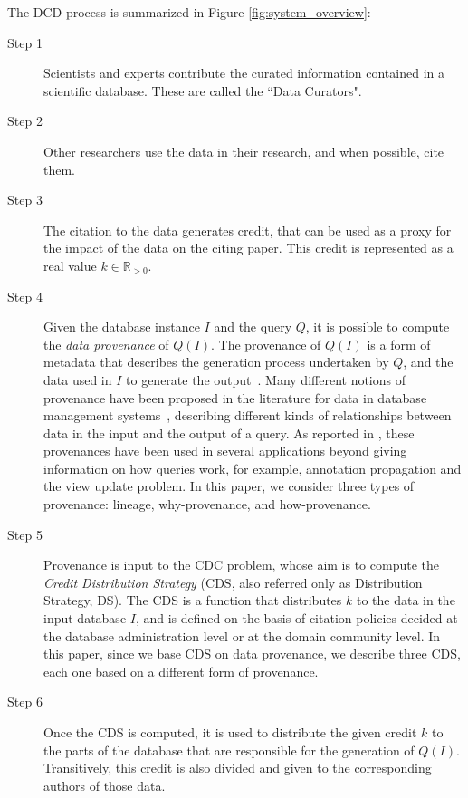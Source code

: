 \vspace{0.15in}
The DCD process is summarized in Figure \ref{fig:system_overview}:
\vspace{0.15in}
\begin{description}
	\item[Step 1] Scientists and experts contribute 
	the curated information contained in a scientific database.  These are called the ``Data Curators".  
	\item[Step 2] Other researchers use the data in their research, and when possible, cite them. 
	\item[Step 3] The citation to the data generates credit, that can be used as a proxy for the impact of the data on the citing paper. This credit is represented as a real value $k \in \mathbb{R}_{>0}$. 
	\item[Step 4] Given the database instance $I$ and the query $Q$, it is possible to compute the \emph{data provenance} of $Q(I)$. The provenance of $Q(I)$ is a form of metadata that describes the generation process undertaken by $Q$, and the data used in $I$ to generate the output~\citep{CheneyProvSurvey}. Many different notions of provenance have been proposed in the literature for data in database management systems~\citep{lineageCui, WhyProvBuneman, howProvenanceGreen}, describing different kinds of relationships between data in the input and the output of a query. As reported in \citep{CheneyProvSurvey}, these provenances have been used in several applications beyond giving information on how queries work, for example, annotation propagation and the view update problem. In this paper, we consider three types of provenance: lineage, why-provenance, and how-provenance. %
	\item[Step 5] Provenance is input to the CDC problem, whose aim is to compute the \emph{Credit Distribution Strategy} (CDS, also referred only as Distribution Strategy, DS). The CDS is a function that distributes $k$ to the data in the input database $I$, and is defined on the basis of citation policies decided at the database administration level or at the domain community level.
	In this paper, since we base CDS on data provenance, we describe three CDS, each one based on a different form of provenance.
	\item[Step 6] Once the CDS is computed, it is used to distribute the given credit $k$ to the parts of the database that are responsible for the generation of $Q(I)$. Transitively, this credit is also divided and given to the corresponding authors of those data.
\end{description}

